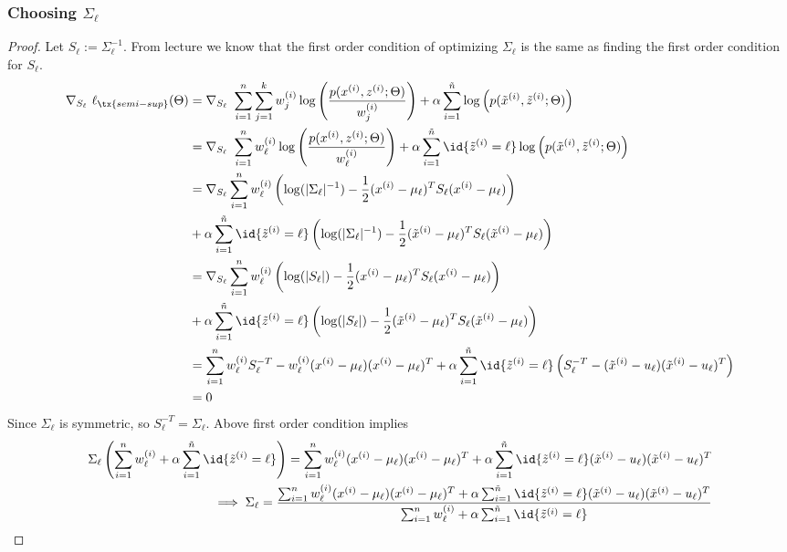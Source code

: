 \documentclass[11pt]{article}
\newcommand{\upi}[0]{^{(i)}}
\begin{document}
	\subsubsection{Choosing $\Sigma_\ell$}
	\begin{proof}
		Let $S_\ell := \Sigma_\ell^{-1}$. From lecture we know that the first order condition of optimizing $\Sigma_\ell$ is the same as finding the first order condition for $S_\ell$.
		\begin{align}
			\nabla_{S_\ell}\ \ell_{\tx{semi-sup}}(\Theta) &= \nabla_{S_\ell}\ \sum_{i=1}^n \sum_{j=1}^k w\upi_j \log \left( \frac{p(x\upi, z\upi; \Theta)}{w\upi_j} \right) + \alpha \sum_{i=1}^{\tilde{n}} \log \left(p(\tilde{x}\upi, \tilde{z}\upi; \Theta)
			\right) \\
			&= \nabla_{S_\ell}\ \sum_{i=1}^n w\upi_\ell \log \left( \frac{p(x\upi, z\upi; \Theta)}{w\upi_\ell} \right) + \alpha \sum_{i=1}^{\tilde{n}} \id{\tilde{z}\upi = \ell} \log \left(p(\tilde{x}\upi, \tilde{z}\upi; \Theta) \right) \\
			&= \nabla_{S_\ell} \sum_{i=1}^n w_\ell\upi \left(
			\log(|\Sigma_\ell|^{-1}) - \frac{1}{2} (x\upi - \mu_\ell)^T S_\ell (x\upi - \mu_\ell) \right) \\
			&+ \alpha \sum_{i=1}^{\tilde{n}} \id{\tilde{z}\upi = \ell} \left (
				\log(|\Sigma_\ell|^{-1}) - \frac{1}{2} (\tilde{x}\upi - \mu_\ell)^T S_\ell (\tilde{x}\upi - \mu_\ell)
			\right) \\
			&= \nabla_{S_\ell} \sum_{i=1}^n w_\ell\upi \left(
			\log(|S_\ell|) - \frac{1}{2} (x\upi - \mu_\ell)^T S_\ell (x\upi - \mu_\ell) \right) \\
			&+ \alpha \sum_{i=1}^{\tilde{n}} \id{\tilde{z}\upi = \ell} \left (
				\log(|S_\ell|) - \frac{1}{2} (\tilde{x}\upi - \mu_\ell)^T S_\ell (\tilde{x}\upi - \mu_\ell)
			\right) \\
			&= \sum_{i=1}^n w_\ell\upi S_\ell^{-T} - w_\ell\upi (x\upi - \mu_\ell) (x\upi - \mu_\ell)^T + \alpha \sum_{i=1}^{\tilde{n}} \id{\tilde{z}\upi = \ell} \left(
			S_\ell^{-T} - (\tilde{x}\upi - u_\ell) (\tilde{x}\upi - u_\ell)^T
			\right) \\
			&= 0
		\end{align}
		Since $\Sigma_\ell$ is symmetric, so $S^{-T}_\ell = \Sigma_\ell$. Above first order condition implies
		\begin{align}
			\Sigma_\ell \left (\sum_{i=1}^n w_\ell\upi + \alpha \sum_{i=1}^{\tilde{n}} \id{\tilde{z}\upi = \ell} \right) = \sum_{i=1}^n w_\ell\upi (x\upi - \mu_\ell) (x\upi - \mu_\ell)^T + \alpha \sum_{i=1}^{\tilde{n}} \id{\tilde{z}\upi = \ell} (\tilde{x}\upi - u_\ell) (\tilde{x}\upi - u_\ell)^T \\
			\implies \Sigma_\ell = \frac{\sum_{i=1}^n w_\ell\upi (x\upi - \mu_\ell) (x\upi - \mu_\ell)^T + \alpha \sum_{i=1}^{\tilde{n}} \id{\tilde{z}\upi = \ell} (\tilde{x}\upi - u_\ell) (\tilde{x}\upi - u_\ell)^T}{\sum_{i=1}^n w_\ell\upi + \alpha \sum_{i=1}^{\tilde{n}} \id{\tilde{z}\upi = \ell}}
		\end{align}
	\end{proof}
\end{document}
